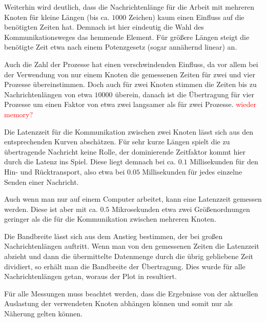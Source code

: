 Weiterhin wird deutlich, dass die Nachrichtenlänge für die Arbeit mit mehreren
Knoten für kleine Längen (bis ca. $1000$ Zeichen) kaum einen Einfluss auf die
benötigten Zeiten hat. Demnach ist hier eindeutig die Wahl des Kommunikationsweges
das hemmende Element. Für größere Längen steigt die benötigte Zeit etwa nach einem 
Potenzgesetz (sogar annähernd linear) an. 

Auch die Zahl der Prozesse hat einen verschwindenden Einfluss, da vor allem bei der
Verwendung von nur einem Knoten die gemessenen Zeiten für zwei und vier Prozesse
übereinstimmen. Doch auch für zwei Knoten stimmen die Zeiten bis zu Nachrichtenlängen 
von etwa $10000$ überein, danach ist die Übertragung für vier Prozesse um einen Faktor
von etwa zwei langsamer als für zwei Prozesse. \textcolor{red}{wieder memory?}

Die Latenzzeit für die Kommunikation zwischen zwei Knoten lässt sich aus den entsprechenden
Kurven abschätzen. Für sehr kurze Längen spielt die zu übertragende Nachricht keine Rolle,
der dominierende Zeitfaktor kommt hier durch die Latenz ins Spiel. Diese liegt demnach bei
ca. $0.1$ Millisekunden für den Hin- und Rücktransport, also etwa bei $0.05$ Millisekunden
für jedes einzelne Senden einer Nachricht.

Auch wenn man nur auf einem Computer arbeitet, kann eine Latenzzeit gemessen werden.
Diese ist aber mit ca. $0.5$ Mikrosekunden etwa zwei Größenordnungen geringer als die
für die Kommunikation zwischen mehreren Knoten.

Die Bandbreite lässt sich aus dem Anstieg bestimmen, der bei großen Nachrichtenlängen
auftritt. Wenn man von den gemessenen Zeiten die Latenzzeit abzieht und dann die
übermittelte Datenmenge durch die übrig gebliebene Zeit dividiert, so erhält man 
die Bandbreite der Übertragung. Dies wurde für alle Nachrichtenlängen getan, woraus
der Plot in  resultiert.



Für alle Messungen muss beachtet werden, dass die Ergebnisse von der aktuellen Auslastung
der verwendeten Knoten abhängen können und somit nur als Näherung gelten können.